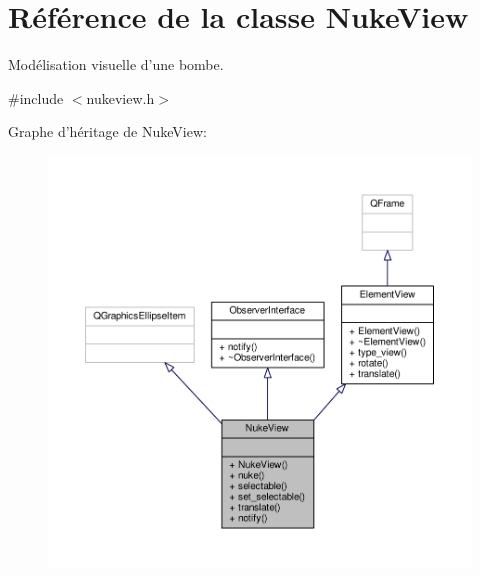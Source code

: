 \hypertarget{classNukeView}{\section{Référence de la classe Nuke\+View}
\label{classNukeView}
}


Modélisation visuelle d’une bombe.  




{\ttfamily \#include $<$nukeview.\+h$>$}



Graphe d'héritage de Nuke\+View\+:\nopagebreak
\begin{figure}[H]
\begin{center}
\leavevmode
\includegraphics[width=350pt]{da/d21/classNukeView__inherit__graph}
\end{center}
\end{figure}


